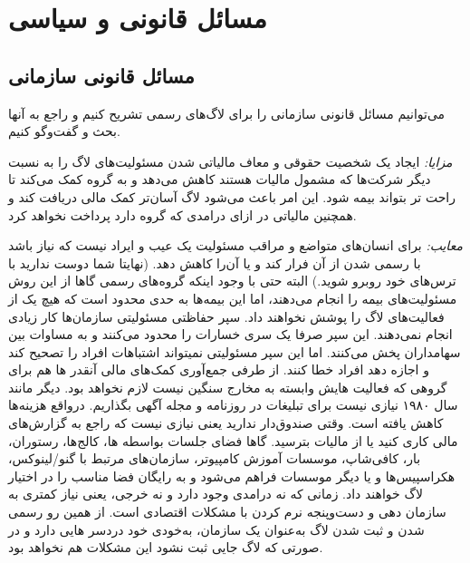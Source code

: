 \section{مسائل قانونی و سیاسی}

\subsection{مسائل قانونی سازمانی}

می‌توانیم مسائل قانونی سازمانی را برای لاگ‌های رسمی تشریح کنیم و راجع
به آنها بحث و گفت‌وگو کنیم.

{\itshape مزایا:}
ایجاد یک شخصیت حقوقی و معاف مالیاتی شدن مسئولیت‌های لاگ
را به نسبت دیگر شرکت‌ها که مشمول مالیات هستند کاهش می‌دهد و به گروه
کمک می‌کند تا راحت تر بتواند بیمه شود. این امر باعث می‌شود لاگ آسان‌تر
کمک مالی دریافت کند و همچنین مالیاتی در ازای درامدی که گروه دارد
پرداخت نخواهد کرد.

{\itshape معایب:}
برای انسان‌های متواضع و مراقب مسئولیت یک عیب و ایراد نیست که نیاز باشد
با رسمی شدن از آن فرار کند و یا آن‌را کاهش دهد.
(نهایتا شما دوست ندارید با ترس‌های خود روبرو شوید.)
البته حتی با وجود اینکه گروه‌های رسمی گاها از این روش مسئولیت‌های بیمه
را انجام می‌دهند، اما این بیمه‌ها به حدی محدود است که هیچ یک از فعالیت‌های
لاگ را پوشش نخواهند داد.
سپر حفاظتی مسئولیتی سازمان‌ها کار زیادی انجام نمی‌دهند. این سپر صرفا
یک سری خسارات را محدود می‌کنند و به مساوات بین سهامداران پخش می‌کنند.
اما این سپر مسئولیتی نمیتواند اشتباهات افراد را تصحیح کند و اجازه دهد
افراد خطا کنند.
از طرفی جمع‌آوری کمک‌های مالی آنقدر ها هم برای گروهی که فعالیت هایش وابسته به
مخارج سنگین نیست لازم نخواهد بود. دیگر مانند سال ۱۹۸۰ نیازی نیست برای تبلیغات
در روزنامه و مجله آگهی بگذاریم. درواقع هزینه‌ها کاهش یافته است.
وقتی صندوق‌دار ندارید یعنی نیازی نیست که راجع به گزارش‌های مالی کاری کنید یا
از مالیات بترسید.
گاها فضای جلسات بواسطه  ها، کالج‌ها، رستوران، بار، کافی‌شاپ، موسسات آموزش کامپیوتر،
سازمان‌های مرتبط با گنو/لینوکس، هکراسپیس‌ها و یا دیگر موسسات فراهم می‌شود و به رایگان
فضا مناسب را در اختیار لاگ خواهند داد.
زمانی که نه درامدی وجود دارد و نه خرجی، یعنی نیاز کمتری به سازمان دهی و دست‌وپنجه
نرم کردن با مشکلات اقتصادی است.
از همین رو رسمی شدن و ثبت شدن لاگ به‌عنوان یک سازمان، به‌خودی خود دردسر هایی دارد
و در صورتی که لاگ جایی ثبت نشود این مشکلات هم نخواهد بود.

